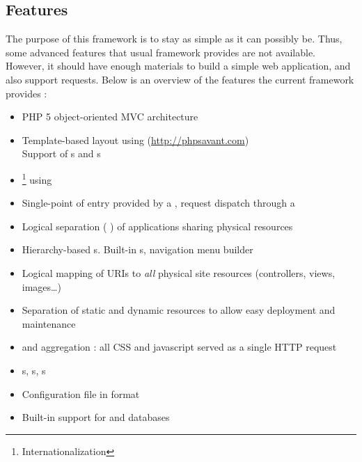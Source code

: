 \documentclass[pdftex,12pt,a4paper]{article}
\begin{document}
\subsection{Features} \label{sec:features}
The purpose of this  framework is to stay as simple as it can possibly be.
Thus, some advanced features that usual  framework provides are not available.
However, it should have enough materials to build a simple web application, and also support  requests.
Below is an overview of the features the current framework provides :
\begin{itemize}
    \item PHP 5 object-oriented MVC architecture
    \item Template-based layout using  (\url{http://phpsavant.com}) \\ Support of s and s
    \item {}\footnote{Internationalization} using 
    \item Single-point of entry provided by a , request dispatch through a 
    \item Logical separation (  ) of applications sharing physical resources
    \item Hierarchy-based s. Built-in s, navigation menu builder
    \item Logical mapping of URIs to \emph{all} physical site resources (controllers, views, images\ldots)
    \item Separation of static and dynamic resources to allow easy deployment and maintenance
    \item {} and  aggregation : all CSS and javascript served as a single HTTP request
    \item {}s, s, s
    \item Configuration file in  format
    \item Built-in support for  and  databases
\end{itemize}
\end{document}
